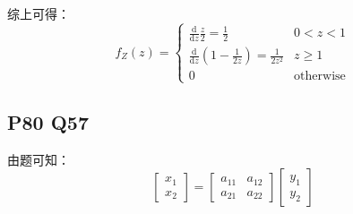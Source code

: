 \documentclass[a4paper,12pt]{ctexart}
\begin{document}
综上可得：
\begin{equation*}
	f_Z(z) = 
	\begin{cases}
		\frac{\mathrm{d}}{\mathrm{d}z} \frac{z}{2} = \frac{1}{2} & 0 < z < 1 \\
		\frac{\mathrm{d}}{\mathrm{d}z} \left(1 - \frac{1}{2z}\right) = \frac{1}{2z^2} & z \geq 1 \\
		0 & \text{otherwise}
	\end{cases}
\end{equation*}

\subsection*{P80 Q57}

由题可知：
\begin{equation*}
    \begin{bmatrix}
        x_1 \\
        x_2
    \end{bmatrix}
    =
    \begin{bmatrix}
        a_{11} & a_{12} \\
        a_{21} & a_{22}
    \end{bmatrix}
    \begin{bmatrix}
        y_1 \\
        y_2
    \end{bmatrix}
\end{equation*}
\end{document}
